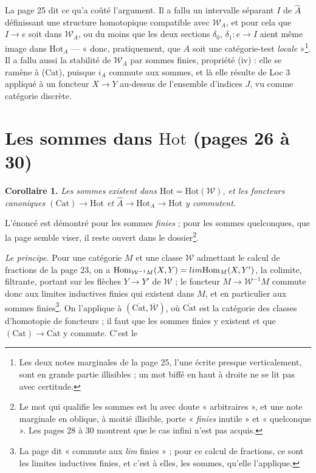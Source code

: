 \documentclass[11pt,a4paper]{article}
\begin{document}
La page 25 dit ce qu'a coûté l'argument. Il a fallu un intervalle séparant $I$
de $\widehat{A}$ définissant une structure homotopique compatible avec
$\mathcal{W}_{A}$, et pour cela que $I \to e$ soit dans
$\mathcal{W}_{A}$, ou du moins que les deux sections $\delta_{0}$,
$\delta_{1} : e \to I$ aient même image dans $\mathrm{Hot}_{A}$ --- « donc,
pratiquement, que $A$ soit une catégorie-test \emph{locale} »\footnote{Les
deux notes marginales de la page 25, l'une écrite presque verticalement, sont
en grande partie illisibles ; un mot biffé en haut à droite ne se lit pas
avec certitude.}. Il a fallu aussi la stabilité de $\mathcal{W}_{A}$ par
sommes finies, propriété (iv) : elle se ramène à (Cat), puisque $i_{A}$
commute aux sommes, et là elle résulte de Loc 3 appliqué à un foncteur
$X \to Y$ au-dessus de l'ensemble d'indices $J$, vu comme catégorie
discrète.

\section*{Les sommes dans $\mathrm{Hot}$ (pages 26 à 30)}

\textbf{Corollaire 1.} \emph{Les sommes existent dans $\mathrm{Hot}
= \mathrm{Hot}(\mathcal{W})$, et les foncteurs canoniques $(\mathrm{Cat}) \to
\mathrm{Hot}$ et $\widehat{A} \to \mathrm{Hot}_{A} \to \mathrm{Hot}$ y
commutent.}

L'énoncé est démontré pour les sommes \emph{finies} ; pour les sommes
quelconques, que la page semble viser, il reste ouvert dans le
dossier\footnote{Le mot qui qualifie les sommes est lu avec doute
« arbitraires », et une note marginale en oblique, à moitié illisible, porte
« \emph{finies} inutile » et « quelconque ». Les pages 28 à 30 montrent que
le cas infini n'est pas acquis.}.

\emph{Le principe.} Pour une catégorie $M$ et une classe $\mathcal{W}$
admettant le calcul de fractions de la page 23, on a
$\mathrm{Hom}_{\mathcal{W}^{-1}M}(X, Y) = \varinjlim \mathrm{Hom}_{M}(X, Y')$,
la colimite, filtrante, portant sur les flèches $Y \to Y'$ de $\mathcal{W}$ ;
le foncteur $M \to \mathcal{W}^{-1}M$ commute donc aux limites inductives
finies qui existent dans $M$, et en particulier aux sommes finies\footnote{La
page dit « commute aux \emph{lim} finies » ; pour ce calcul de fractions, ce
sont les limites inductives finies, et c'est à elles, les sommes, qu'elle
l'applique.}. On l'applique à $(\overline{\mathrm{Cat}},
\overline{\mathcal{W}})$, où $\overline{\mathrm{Cat}}$ est la catégorie des
classes d'homotopie de foncteurs ; il faut que les sommes finies y existent et
que $(\mathrm{Cat}) \to \overline{\mathrm{Cat}}$ y commute. C'est le
\end{document}
